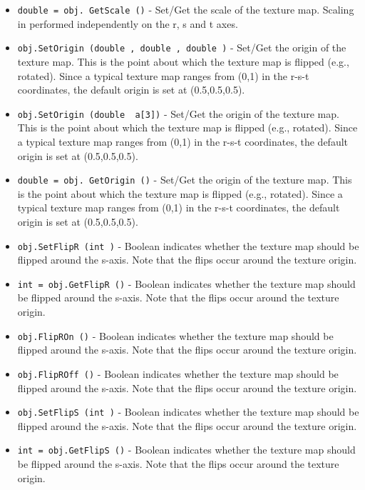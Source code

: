 \begin{itemize}
\item  \verb|double = obj. GetScale ()| -  Set/Get the scale of the texture map. Scaling in performed independently 
 on the r, s and t axes.

\item  \verb|obj.SetOrigin (double , double , double )| -  Set/Get the origin of the texture map. This is the point about which the
 texture map is flipped (e.g., rotated). Since a typical texture map ranges
 from (0,1) in the r-s-t coordinates, the default origin is set at 
 (0.5,0.5,0.5).

\item  \verb|obj.SetOrigin (double  a[3])| -  Set/Get the origin of the texture map. This is the point about which the
 texture map is flipped (e.g., rotated). Since a typical texture map ranges
 from (0,1) in the r-s-t coordinates, the default origin is set at 
 (0.5,0.5,0.5).

\item  \verb|double = obj. GetOrigin ()| -  Set/Get the origin of the texture map. This is the point about which the
 texture map is flipped (e.g., rotated). Since a typical texture map ranges
 from (0,1) in the r-s-t coordinates, the default origin is set at 
 (0.5,0.5,0.5).

\item  \verb|obj.SetFlipR (int )| -  Boolean indicates whether the texture map should be flipped around the 
 s-axis. Note that the flips occur around the texture origin.

\item  \verb|int = obj.GetFlipR ()| -  Boolean indicates whether the texture map should be flipped around the 
 s-axis. Note that the flips occur around the texture origin.

\item  \verb|obj.FlipROn ()| -  Boolean indicates whether the texture map should be flipped around the 
 s-axis. Note that the flips occur around the texture origin.

\item  \verb|obj.FlipROff ()| -  Boolean indicates whether the texture map should be flipped around the 
 s-axis. Note that the flips occur around the texture origin.

\item  \verb|obj.SetFlipS (int )| -  Boolean indicates whether the texture map should be flipped around the 
 s-axis. Note that the flips occur around the texture origin.

\item  \verb|int = obj.GetFlipS ()| -  Boolean indicates whether the texture map should be flipped around the 
 s-axis. Note that the flips occur around the texture origin.


\end{itemize}
